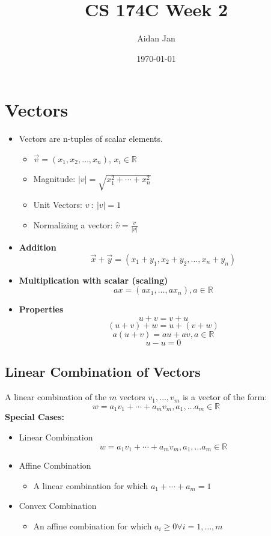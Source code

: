 \documentclass{article}
\title{CS 174C Week 2}
\author{Aidan Jan}
\date{\today}
\newcommand{\R}{\mathbb{R}} %
\begin{document}
\maketitle
\section*{Vectors}
\begin{itemize}
    \item Vectors are n-tuples of scalar elements.  
    \begin{itemize}
        \item $\vec v = (x_1, x_2, \dots, x_n)$, $x_i \in \R$
        \item Magnitude: $\vert v \vert = \sqrt{x_1^2 + \cdots + x_n^2}$
        \item Unit Vectors: $v\::\: \vert v \vert = 1$
        \item Normalizing a vector: $\hat v = \frac{v}{\vert v \vert}$
    \end{itemize}
    
    \item \textbf{Addition}
    \[\vec x + \vec y = (x_1 + y_1, x_2 + y_2, \dots, x_n + y_n)\]
    \item \textbf{Multiplication with scalar (scaling)}
    \[ax = (ax_1, \dots, ax_n), a \in \R \]
    \item \textbf{Properties}
        \[u + v = v + u\]
        \[(u + v) + w = u + (v + w)\]
        \[a(u + v) = au + av, a \in \R\]
        \[u - u = 0\]    
\end{itemize}

\subsection*{Linear Combination of Vectors}
A linear combination of the $m$ vectors $v_1, \dots, v_m$ is a vector of the form:
\[w = a_1v_1 + \cdots + a_m v_m, a_1, \dots a_m \in \R\]
\textbf{Special Cases:}
\begin{itemize}
    \item Linear Combination
    \[w = a_1v_1 + \cdots + a_m v_m, a_1, \dots a_m \in \R\]
    \item Affine Combination
        \begin{itemize}
            \item A linear combination for which $a_1 + \cdots + a_m = 1$ 
        \end{itemize}
    \item Convex Combination
        \begin{itemize}
            \item An affine combination for which $a_i \geq 0 \forall i = 1, \dots, m$
        \end{itemize}
\end{itemize}
\end{document}
